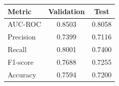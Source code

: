 \documentclass[portrait,a0paper,fontscale=0.31]{baposter} %
\begin{document}
\begin{poster}
{\small
\begin{center}
\begin{tabular}{lcc}
\toprule
\textbf{Metric} & \textbf{Validation} & \textbf{Test} \\
\midrule
AUC-ROC   & 0.8503 & 0.8058 \\
Precision & 0.7399 & 0.7116 \\
Recall    & 0.8001 & 0.7400 \\
F1-score  & 0.7688 & 0.7255 \\
Accuracy  & 0.7594 & 0.7200 \\
\bottomrule
\end{tabular}
\end{center}


}










\end{poster}
\end{document}
